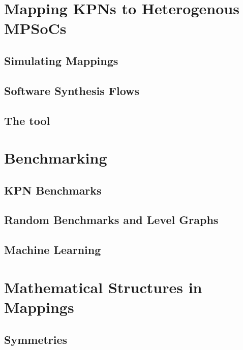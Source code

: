 \documentclass[
		twoside,openright,titlepage,numbers=noenddot,headinclude,%
	 	footinclude=true,cleardoublepage=empty,
		dottedtoc, %
		BCOR=5mm,paper=a4,fontsize=10pt, %
		ngerman,american, %
		]{scrreprt}
\begin{document}
%
\chapter{Mapping KPNs to Heterogenous MPSoCs}
\label{chap:mapping}


\section{Simulating Mappings}
\label{sec:simulating_mappings}

\section{Software Synthesis Flows}
\label{sec:software_synthesis_flows}

\section{The \mocasin tool}
\label{sec:mocasin}


\chapter{Benchmarking}
\label{chap:benchmarking}

\section{KPN Benchmarks}
\label{sec:kpn_benchmarks}

\section{Random Benchmarks and Level Graphs}
\label{sec:level_graphs}
\section{Machine Learning}
\label{sec:machine_learning}


\chapter{Mathematical Structures in Mappings}
\label{chap:mapping_structures}

\section{Symmetries}
\label{sec:symmetries}
\end{document}
